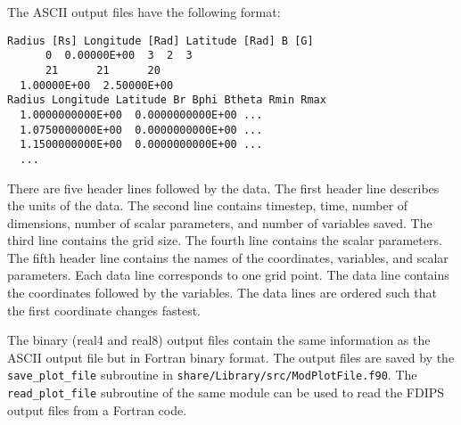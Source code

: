 \documentclass[12pt]{article}
\begin{document}
The ASCII output files have the following format:
\begin{verbatim}
Radius [Rs] Longitude [Rad] Latitude [Rad] B [G]
      0  0.00000E+00  3  2  3
      21      21      20
  1.00000E+00  2.50000E+00
Radius Longitude Latitude Br Bphi Btheta Rmin Rmax
  1.0000000000E+00  0.0000000000E+00 ...
  1.0750000000E+00  0.0000000000E+00 ...
  1.1500000000E+00  0.0000000000E+00 ...
  ...
\end{verbatim}
There are five header lines followed by the data. The first header line
describes the units of the data. The second line contains timestep, time,
number of dimensions, number of scalar parameters, and number of variables 
saved. The third line contains the grid size. The fourth line contains
the scalar parameters. The fifth header line contains the names of the 
coordinates, variables, and scalar parameters. 
Each data line corresponds to one grid point. 
The data line contains the coordinates followed by the variables.
The data lines are ordered such that the first coordinate changes fastest.

The binary (real4 and real8) output files contain the same information 
as the ASCII output file but in Fortran binary format. 
The output files are saved by the {\tt save\_plot\_file} 
subroutine in {\tt share/Library/src/ModPlotFile.f90}. 
The {\tt read\_plot\_file} subroutine of the same module
can be used to read the FDIPS output files from a Fortran code.


\end{document}
